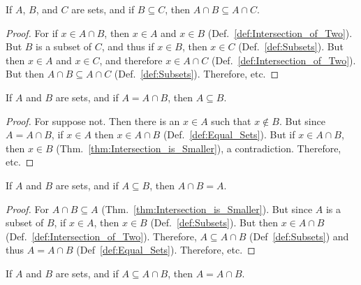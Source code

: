         \begin{theorem}
            \label{thm:Intersection_with_Lesser_Set}%
            If $A$, $B$, and $C$ are sets, and if
            $B\subseteq{C}$, then
            $A\cap{B}\subseteq{A}\cap{C}$.
        \end{theorem}
        \begin{proof}
            For if $x\in{A}\cap{B}$, then $x\in{A}$ and
            $x\in{B}$ (Def.~\ref{def:Intersection_of_Two}).
            But $B$ is a subset of $C$, and thus if
            $x\in{B}$, then $x\in{C}$
            (Def.~\ref{def:Subsets}). But then $x\in{A}$ and
            $x\in{C}$, and therefore $x\in{A}\cap{C}$
            (Def.~\ref{def:Intersection_of_Two}). But
            then $A\cap{B}\subseteq{A}\cap{C}$
            (Def.~\ref{def:Subsets}). Therefore, etc.
        \end{proof}
        \begin{theorem}
            \label{thm:Intersection_is_Equal}%
            If $A$ and $B$ are sets, and if
            $A=A\cap{B}$, then $A\subseteq{B}$.
        \end{theorem}
        \begin{proof}
            For suppose not. Then there is an $x\in{A}$ such
            that $x\notin{B}$. But since $A=A\cap{B}$,
            if $x\in{A}$ then $x\in{A}\cap{B}$
            (Def.~\ref{def:Equal_Sets}). But if
            $x\in{A}\cap{B}$, then $x\in{B}$
            (Thm.~\ref{thm:Intersection_is_Smaller}),
            a contradiction. Therefore, etc.
        \end{proof}
        \begin{theorem}
            \label{thm:Intersection_of_Subset}%
            If $A$ and $B$ are sets, and if
            $A\subseteq{B}$, then $A\cap{B}=A$.
        \end{theorem}
        \begin{proof}
            For $A\cap{B}\subseteq{A}$
            (Thm.~\ref{thm:Intersection_is_Smaller}). But
            since $A$ is a subset of $B$, if $x\in{A}$, then
            $x\in{B}$ (Def.~\ref{def:Subsets}). But then
            $x\in{A}\cap{B}$
            (Def.~\ref{def:Intersection_of_Two}). Therefore,
            $A\subseteq{A}\cap{B}$ (Def~\ref{def:Subsets})
            and thus $A=A\cap{B}$ (Def~\ref{def:Equal_Sets}).
            Therefore, etc.
        \end{proof}
        \begin{theorem}
            \label{thm:Conv_Intersection_is_Smaller}%
            If $A$ and $B$ are sets, and if
            $A\subseteq{A}\cap{B}$, then $A=A\cap{B}$.
        \end{theorem}
